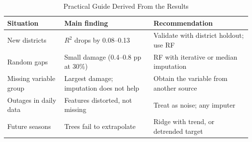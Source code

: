 \begin{table}[!t]
\caption{Practical Guide Derived From the Results}\label{tab:guide}
\centering\footnotesize\setlength{\tabcolsep}{3pt}
\begin{tabular}{p{2.2cm}p{2.6cm}p{2.6cm}}
\toprule
Situation & Main finding & Recommendation \\
\midrule
New districts & $R^2$ drops by 0.08--0.13 & Validate with district holdout; use RF \\
Random gaps & Small damage (0.4--0.8 pp at 30\%) & RF with iterative or median imputation \\
Missing variable group & Largest damage; imputation does not help & Obtain the variable from another source \\
Outages in daily data & Features distorted, not missing & Treat as noise; any imputer \\
Future seasons & Trees fail to extrapolate & Ridge with trend, or detrended target \\
\bottomrule
\end{tabular}
\end{table}
